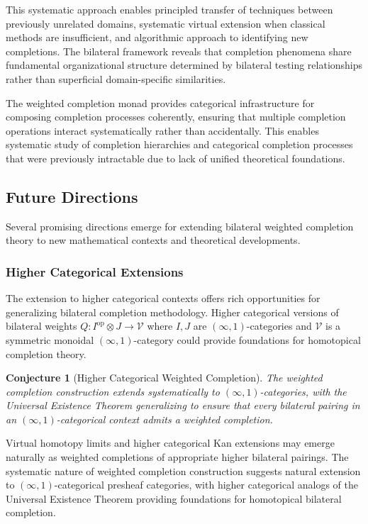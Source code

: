 \documentclass[11pt]{article}
\theoremstyle{plain}
\newtheorem{conjecture}[theorem]{Conjecture}
\theoremstyle{definition}
\theoremstyle{remark}
\newcommand{\V}{\mathcal{V}}
\newcommand{\op}{\mathrm{op}}
\begin{document}
This systematic approach enables principled transfer of techniques between previously unrelated domains, systematic virtual extension when classical methods are insufficient, and algorithmic approach to identifying new completions. The bilateral framework reveals that completion phenomena share fundamental organizational structure determined by bilateral testing relationships rather than superficial domain-specific similarities.

The weighted completion monad provides categorical infrastructure for composing completion processes coherently, ensuring that multiple completion operations interact systematically rather than accidentally. This enables systematic study of completion hierarchies and categorical completion processes that were previously intractable due to lack of unified theoretical foundations.

\subsection{Future Directions}

Several promising directions emerge for extending bilateral weighted completion theory to new mathematical contexts and theoretical developments.

\subsubsection{Higher Categorical Extensions}

The extension to higher categorical contexts offers rich opportunities for generalizing bilateral completion methodology. Higher categorical versions of bilateral weights $Q : I^{\op} \otimes J \to \V$ where $I, J$ are $(\infty, 1)$-categories and $\V$ is a symmetric monoidal $(\infty, 1)$-category could provide foundations for homotopical completion theory.

\begin{conjecture}[Higher Categorical Weighted Completion]
The weighted completion construction extends systematically to $(\infty, 1)$-categories, with the Universal Existence Theorem generalizing to ensure that every bilateral pairing in an $(\infty, 1)$-categorical context admits a weighted completion.
\end{conjecture}

Virtual homotopy limits and higher categorical Kan extensions may emerge naturally as weighted completions of appropriate higher bilateral pairings. The systematic nature of weighted completion construction suggests natural extension to $(\infty, 1)$-categorical presheaf categories, with higher categorical analogs of the Universal Existence Theorem providing foundations for homotopical bilateral completion.
\end{document}
